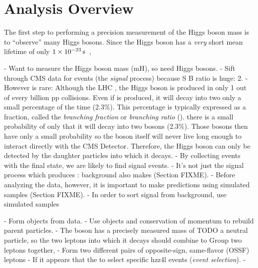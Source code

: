 \section{Analysis Overview}
\label{sec:analysis_overview}
The first step to performing a precision measurement of the Higgs boson mass is to ``observe'' many Higgs bosons.
Since the Higgs boson has a \emph{very} short mean lifetime of only $1 \times \text{10}^\text{$-$23}\,\text{s}$~\cite{pdg},


- Want to measure the Higgs boson mass (mH), so need Higgs bosons.
- Sift through CMS data for \hzzfourl events (the \emph{signal} process) because S B ratio is huge: 2.
    - However \hzzfourl is rare:
Although the LHC , the Higgs boson is produced in only 1 out of every billion pp collisions.
Even if \PH is produced, it will decay into two \PZ only a small percentage of the time (2.3\%).
This percentage is typically expressed as a fraction, called the \emph{branching fraction} or \emph{branching ratio} (\br).
there is a small probability of only  that it will decay into two \PZ bosons (2.3\%).
Those \PZ bosons then have only a small probability 
so the boson itself will never live long enough to interact directly with the CMS Detector.
Therefore, the Higgs boson can only be detected by the daughter particles into which it decays.
- By collecting events with the \fourl final state, we are likely to find signal events.
    - It's not just the signal process which produces \fourl: background also makes \fourl (Section FIXME).
- Before analyzing the data, however, it is important to make predictions using simulated samples (Section FIXME).
- In order to sort signal from background, use simulated samples 

- Form objects from data.
- Use objects and conservation of momentum to rebuild parent particles.
    - The \PZ boson has a precisely measured mass of TODO a neutral particle, so the two leptons into which it decays should combine to Group two leptons together, 
    - Form two different pairs of opposite-sign, same-flavor (OSSF) leptons
    - If it appears that the to select specific hzz4l events (\emph{event selection}).
- 


